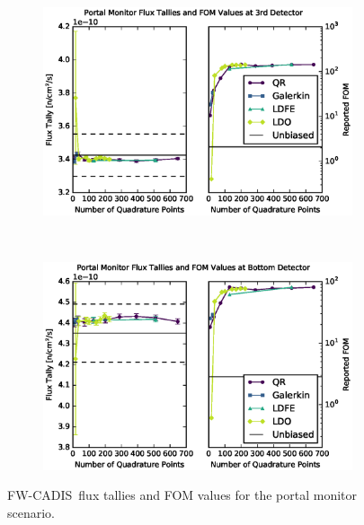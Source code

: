 \documentclass{article} %
\newcommand{\fwc}{\mbox{FW-CADIS}}
\begin{document}
\begin{figure}[!htb]
\ContinuedFloat
\begin{subfigure}{\textwidth}
\centering
\includegraphics[max height=0.445\textheight]
{img/portal-fwcadis-3.eps}
\end{subfigure}
\\
\begin{subfigure}{\textwidth}
\centering
\includegraphics[max height=0.445\textheight]
{img/portal-fwcadis-4.eps}
\end{subfigure}
\caption{\fwc\ flux tallies and FOM values for the portal monitor scenario.}
\label{cargo-fwc}
\end{figure}

\FloatBarrier
\end{document}
